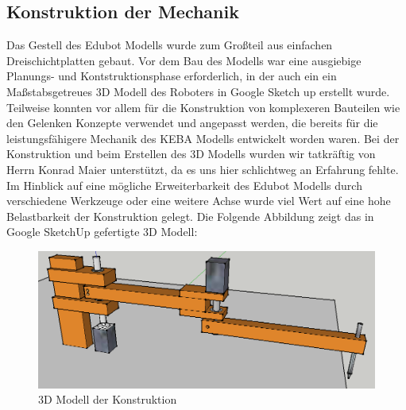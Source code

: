 \subsection{Konstruktion der Mechanik}
Das Gestell des Edubot Modells wurde zum Großteil aus einfachen Dreischichtplatten gebaut. Vor dem Bau des Modells war eine ausgiebige Planungs- und Kontstruktionsphase erforderlich, in der auch ein ein Maßstabsgetreues 3D Modell des Roboters in Google Sketch up erstellt wurde.
Teilweise konnten vor allem für die Konstruktion von komplexeren Bauteilen wie den Gelenken Konzepte verwendet und angepasst werden, die bereits für die leistungsfähigere Mechanik des KEBA Modells entwickelt worden waren.
Bei der Konstruktion und beim Erstellen des 3D Modells wurden wir tatkräftig von Herrn Konrad Maier unterstützt, da es uns hier schlichtweg an Erfahrung fehlte.
\newpage
Im Hinblick auf eine mögliche Erweiterbarkeit des Edubot Modells durch verschiedene Werkzeuge oder eine weitere Achse wurde viel Wert auf eine hohe Belastbarkeit der Konstruktion gelegt.
Die Folgende Abbildung zeigt das in Google SketchUp gefertigte 3D Modell:

\begin{figure}[H]
  \centering
  \begin{minipage}[t]{12 cm}
  	\centering
  	\includegraphics[width=12cm]{images/edubot_complete} 
    \caption{3D Modell der Konstruktion}
  \end{minipage}
\end{figure}

